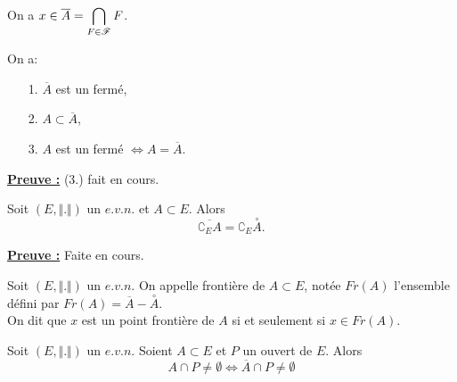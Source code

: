 \documentclass[class=report,crop=false]{standalone}
\begin{document}
 \begin{remarque*}
\textcolor[rgb]{0.00,0.00,1.00}{
\noindent On a $x\in \overline{A}=\displaystyle \bigcap_{F \in \mathscr{F}} F$.
}
\end{remarque*}

\begin{remarque*}
\textcolor[rgb]{0.00,0.00,1.00}{
\noindent On a:
\begin{itemize}
\item[1.] $\overline{A}$ est un fermé,
\item[2.] $A \subset \overline{A}$,
\item[3.] $A$ est un fermé $\Longleftrightarrow A=\overline{A}$.
\end{itemize}
}
\end{remarque*}


\noindent \underline{\bf Preuve :}
(3.) fait en cours.

\begin{proposition}
\textcolor[rgb]{0.50,0.00,0.25}{\vspace{0.1cm}
Soit $(E,\Vert . \Vert)$ un $e.v.n.$ et $A \subset E$. Alors  
 \begin{equation*}
  \overline{\complement_E A}= \complement_E \overset{\circ}{A}.
 \end{equation*}
}
\end{proposition}

\noindent \underline{\bf Preuve :}
Faite en cours.



\begin{definition}[FRONTIERE]
\textcolor[rgb]{0.73,0.00,0.00}{
\noindent Soit $(E,\Vert . \Vert)$ un $e.v.n$. On appelle frontière de $A \subset E$, notée $Fr(A)$ l'ensemble défini par
$Fr(A)=\overline{A}-\overset{\circ}{A}$.\\
On dit que $x$ est un point frontière de $A$ si et seulement si $x \in Fr(A)$.
}
\end{definition}

 

\begin{proposition}
\textcolor[rgb]{0.50,0.00,0.25}{\vspace{0.1cm}
Soit $(E,\Vert . \Vert)$ un $e.v.n$. Soient $A \subset E$ et $P$ un ouvert de $E$. Alors 
 \begin{equation*}
 A\cap P \neq \emptyset \Longleftrightarrow  \overline{A}\cap P \neq \emptyset
 \end{equation*}
}
\end{proposition}
\end{document}

